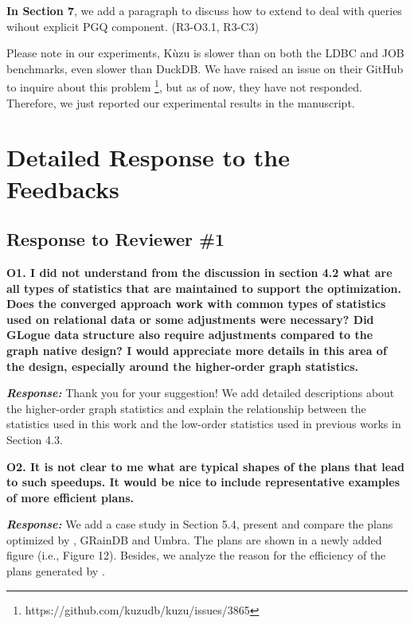 \textbf{In Section 7}, we add a paragraph to discuss how to extend \name to deal with queries wihout explicit PGQ component. (R3-O3.1, R3-C3)

Please note in our experiments, K\`uzu is slower than \name on both the LDBC and JOB benchmarks, even slower than DuckDB. We have raised an issue on their GitHub to inquire about this problem \footnote{https://github.com/kuzudb/kuzu/issues/3865}, but as of now, they have not responded. Therefore, we just reported our experimental results in the manuscript.

\section{Detailed Response to the Feedbacks}
\label{sec:response}
\subsection{Response to Reviewer \#1}

\textbf{O1. I did not understand from the discussion in section 4.2 what are all types of statistics that are maintained to support the optimization. Does the converged approach work with common types of statistics used on relational data or some adjustments were necessary? Did GLogue data structure also require adjustments compared to the graph native design? I would appreciate more details in this area of the design, especially around the higher-order graph statistics.}

\textbf{\textit{Response: }}
Thank you for your suggestion! We add detailed descriptions about the higher-order graph statistics and explain the relationship between the statistics used in this work and the low-order statistics used in previous works in Section 4.3.



\textbf{O2. It is not clear to me what are typical shapes of the plans that lead to such speedups. It would be nice to include representative examples of more efficient plans.}

\textbf{\textit{Response: }}
We add a case study in Section 5.4, present and compare the plans optimized by \name, GRainDB and Umbra. 
The plans are shown in a newly added figure (i.e., Figure 12). 
Besides, we analyze the reason for the efficiency of the plans generated by \name.



